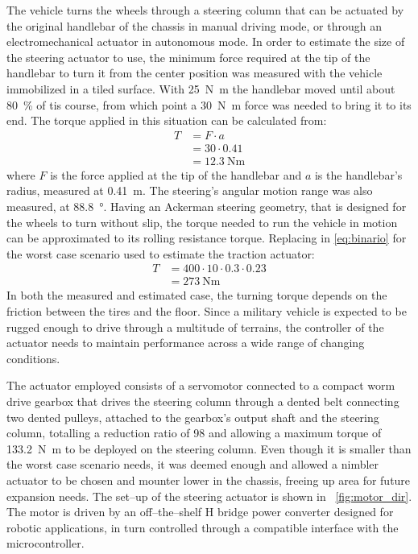 \documentclass[journal]{IEEEtran}
\begin{document}
The vehicle turns the wheels through a steering column that can be actuated by the original handlebar of the chassis in manual driving mode, or through an electromechanical actuator in autonomous mode. In order to estimate the size of the steering actuator to use, the  minimum force required at the tip of the handlebar to turn it from the center position was measured with the vehicle immobilized in a tiled surface. With \SI{25}{\newton\meter} the handlebar moved until about \SI{80}{\%} of tis course, from which point a \SI{30}{\newton\meter} force was needed to bring it to its end. The torque applied in this situation can be calculated from:
%
\begin{align}
    T &= F \cdot a\\
        &= 30 \cdot 0.41\\
        &= \SI{12.3}{\newton\meter}
\end{align}
%
where $F$ is the force applied at the tip of the handlebar and $a$ is the handlebar's radius, measured at \SI{0.41}{\meter}. The steering's angular motion range was also measured, at \SI{88.8}{\degree}. Having an Ackerman steering geometry, that is designed for the wheels to turn without slip, the torque needed to run the vehicle in motion can be approximated to its rolling resistance torque. Replacing in \eqref{eq:binario} for the worst case scenario used to estimate the traction actuator:
%
\begin{align}
    T &=400 \cdot 10 \cdot 0.3 \cdot 0.23\\
      &=\SI{273}{\newton\meter}
\end{align}
%
In both the measured and estimated case, the turning torque depends on the friction between the tires and the floor. Since a military vehicle is expected to be rugged enough to drive through a multitude of terrains, the controller of the actuator needs to maintain performance across a wide range of changing conditions.

The actuator employed consists of a servomotor connected to a compact worm drive gearbox that drives the steering column through a dented belt connecting two dented pulleys, attached to the gearbox's output shaft and the steering column, totalling a reduction ratio of \num{98} and allowing a maximum torque of \SI{133.2}{\newton\meter} to be deployed on the steering column. Even though it is smaller than the worst case scenario needs, it was deemed enough and allowed a nimbler actuator to be chosen and mounter lower in the chassis, freeing up area for future expansion needs. The set--up of the steering actuator is shown in \figurename~\ref{fig:motor_dir}. The motor is driven by an off--the--shelf H bridge power converter designed for robotic applications, in turn controlled through a compatible interface with the microcontroller.
\end{document}
